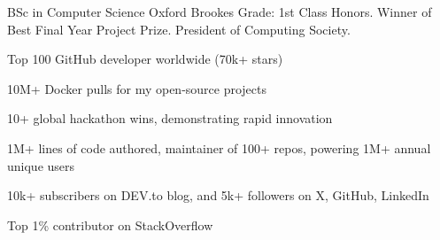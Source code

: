 \documentclass[]{resume-format}
\begin{document}

\begin{cventries}
    \cventry
    { BSc in Computer Science }
    { Oxford Brookes }
    {}
    {}
    {Grade: 1st Class Honors. Winner of Best Final Year Project Prize. President of Computing Society.}
\end{cventries}



\vspace{0.5mm}  %
\begin{cvskills}
\end{cvskills}




\vspace{0.5mm}
\begin{cvachievements}
\setlength{\itemsep}{0mm}
  \item { Top 100 GitHub developer worldwide (70k+ stars) \href{ https://gitstar-ranking.com/Lissy93 }{\scriptsize\color{lightgray}\faLink} }
  \item { 10M+ Docker pulls for my open-source projects \href{ https://hub.docker.com/u/lissy93 }{\scriptsize\color{lightgray}\faLink} }
  \item { 10+ global hackathon wins, demonstrating rapid innovation \href{ https://notes.aliciasykes.com/p/0s5s3uOtKj }{\scriptsize\color{lightgray}\faLink} }
  \item { 1M+ lines of code authored, maintainer of 100+ repos, powering 1M+ annual unique users \href{ https://codestats.net/users/alicia }{\scriptsize\color{lightgray}\faLink} }
  \item { 10k+ subscribers on DEV.to blog, and 5k+ followers on X, GitHub, LinkedIn \href{ https://dev.to/lissy93 }{\scriptsize\color{lightgray}\faLink} }
  \item { Top 1\% contributor on StackOverflow \href{ https://stackoverflow.com/users/979052/alicia-sykes }{\scriptsize\color{lightgray}\faLink} }
\end{cvachievements}
\end{document}
